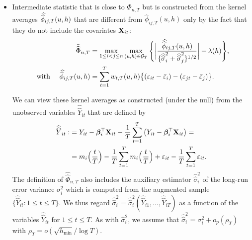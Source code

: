 \documentclass[a4paper,12pt]{article}
\newcommand{\doublehat}[1]{\skew{5.5}\widehat{\widehat{#1}}}
\newcommand{\doublehattwo}[1]{\widehat{\widehat{#1}}}
\begin{document}
\begin{itemize}
\item Intermediate statistic that is close to $\widehat{\Phi}_{n, T}$ but is constructed from the kernel averages $\doublehat{\phi}_{ij,T}(u,h)$ that are different from $\widehat{\phi}_{ij,T}(u,h)$ only by the fact that they do not include the covariates $\mathbf{X}_{it}$:
\begin{align*}
	\doublehattwo{\Phi}_{n,T} &= \max_{1 \le i < j \le n} \max_{(u,h) \in \mathcal{G}_T}\Bigg\{ \bigg| \frac{\doublehat{\phi}_{ij,T}(u,h)} {\{ \doublehattwo{\sigma}_i^2 + \doublehattwo{\sigma}_j^2 \}^{1/2}} \bigg| - \lambda(h)\Bigg\}, \\
   \text{ with  } \quad  	 \doublehat{\phi}_{ij,T}(u,h) &= \sum_{t=1}^T w_{t,T}(u,h) \big\{ (\varepsilon_{it} - \bar{\varepsilon}_i) - (\varepsilon_{jt} - \bar{\varepsilon}_j)  \big\}.\nonumber 
\end{align*}

We can view these kernel averages as constructed (under the null) from the unobserved variables $\doublehattwo{Y}_{it}$ that are defined by 
\begin{align*}
\doublehattwo{Y}_{it} :&= Y_{it} - \bfbeta_i^\top \mathbf{X}_{it} -  \frac{1}{T}\sum_{t=1}^T \big(Y_{it} - \bfbeta_i^\top \mathbf{X}_{it}\big) =\\
&=m_i \Big( \frac{t}{T} \Big)  - \frac{1}{T}\sum_{t=1}^T  m_i \Big( \frac{t}{T} \Big) + \varepsilon_{it} - \frac{1}{T}\sum_{t=1}^T \varepsilon_{it}.
\end{align*}
The definition of $\doublehattwo{\Phi}_{n,T}$ also includes the auxiliary estimator $\doublehattwo{\sigma}_i^2$ of the long-run error variance $\sigma_i^2$ which is computed from the augmented sample $\{ \doublehattwo{Y}_{it}: 1 \le t \le T \}$. We thus regard $\doublehattwo{\sigma}_i^2 = \doublehattwo{\sigma}_i^2(\doublehattwo{Y}_{i1},\ldots,\doublehattwo{Y}_{iT})$ as a function of the variables $\doublehattwo{Y}_{it}$ for $1 \le t \le T$. As with $\widehat{\sigma}_i^2$, we assume that $\doublehattwo{\sigma}_i^2 = \sigma^2_i + o_p(\rho_T)$ with $\rho_T = o(\sqrt{h_{\min}}/\log T)$.




\end{itemize}
\end{document}
